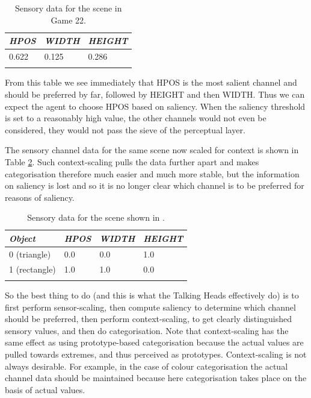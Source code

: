 \begin{table}
\begin{center}
\begin{tabular}{ l  l  l }
\lsptoprule
{\itshape HPOS} & {\itshape WIDTH} & {\itshape HEIGHT} \\ \midrule
 0.622 & 0.125 & 0.286  \\ 
\lspbottomrule
\end{tabular}
\caption{\label{tab:t-game22-sal}Sensory data for the scene in Game 22.}
\end{center}
\end{table}
From this table we see immediately that HPOS is the 
most salient channel and should be preferred by far, followed
by HEIGHT and then WIDTH. Thus we can expect the
agent to choose HPOS based on saliency. When the saliency threshold
is set to a reasonably high value, the other channels
would not even be considered, they would not pass the 
sieve of the perceptual layer. 

The sensory channel data for the 
same scene now scaled for context is shown in Table \ref{tab:t-game22scaled}. Such context-scaling 
pulls the data further apart and makes categorisation 
therefore much easier and much more 
stable, but the information on saliency is lost and so 
it is no longer clear which channel is to be preferred
for reasons of saliency. 

\begin{table}
\begin{center}
\begin{tabular}{ l  l  l  l }
\lsptoprule
{\itshape Object} & {\itshape HPOS} & {\itshape WIDTH} & {\itshape HEIGHT} \\ \midrule
0 (triangle) & 0.0 & 0.0 & 1.0  \\ 
1 (rectangle) & 1.0 & 1.0 & 0.0 \\  
\lspbottomrule
\end{tabular}
\caption{\label{tab:t-game22scaled}Sensory data for the scene shown in .}
\end{center}
\end{table}
So the best thing to do (and this is what the Talking Heads 
effectively do) is to first perform sensor-scaling, then 
compute saliency to determine which channel should be 
preferred, then perform context-scaling, to get clearly 
distinguished sensory values, and then do categorisation. 
Note that context-scaling has the same effect as using 
prototype-based categorisation because the actual values 
are pulled towards extremes, and thus perceived as 
prototypes. Context-scaling is not always desirable. For example, 
in the case of colour categorisation the actual channel
data should be maintained because here categorisation 
takes place on the basis of actual values. 

